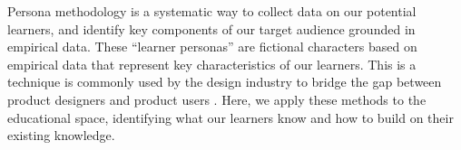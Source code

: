 \documentclass[020-persona\_validation.tex]{subfiles}
\begin{document}


    Persona methodology is a systematic way to collect data on our potential learners,
    and identify key components of our target audience grounded in empirical data.
    These ``learner personas'' are fictional characters based on empirical data that represent key characteristics
    of our learners.
    This is a technique is commonly used by the design industry to bridge the gap between product designers and product users
    \cite{pruittPersonaLifecycleKeeping2006, zagallo2019through, schwartzParadoxChoiceWhy2016}.
    Here, we apply these methods to the educational space,
    identifying what our learners know and how to build on their existing knowledge.
\end{document}
